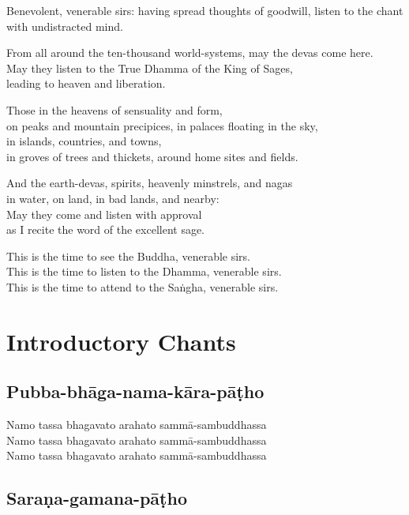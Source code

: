 \begin{english}
  Benevolent, venerable sirs: having spread thoughts of goodwill, listen to the
  chant with undistracted mind.

  From all around the ten-thousand world-systems, may the devas come here.\\
  May they listen to the True Dhamma of the King of Sages,\\
  leading to heaven and liberation.

  Those in the heavens of sensuality and form,\\
  on peaks and mountain precipices, in palaces floating in the sky,\\
  in islands, countries, and towns,\\
  in groves of trees and thickets, around home sites and fields.

  And the earth-devas, spirits, heavenly minstrels, and nagas\\
  in water, on land, in bad lands, and nearby:\\
  May they come and listen with approval\\
  as I recite the word of the excellent sage.

  This is the time to see the Buddha, venerable sirs.\\
  This is the time to listen to the Dhamma, venerable sirs.\\
  This is the time to attend to the Saṅgha, venerable sirs.
\end{english}

\clearpage

\section{Introductory Chants}

\subsection{Pubba-bhāga-nama-kāra-pāṭho}
\label{namo-tassa}

Namo tassa bhagavato arahato sammā-sambuddhassa\\
Namo tassa bhagavato arahato sammā-sambuddhassa\\
Namo tassa bhagavato arahato sammā-sambuddhassa

\subsection{Saraṇa-gamana-pāṭho}
\label{buddham-saranam}

